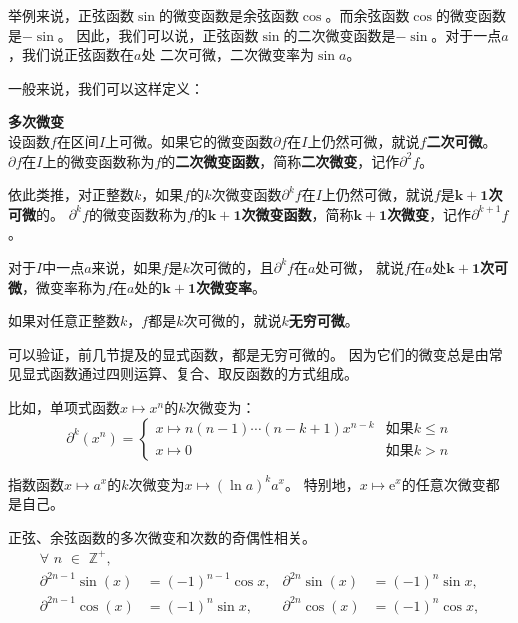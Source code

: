 \documentclass[12pt,UTF8,fontset=none]{ctexbook}
\begin{document}
举例来说，正弦函数$\sin$的微变函数是余弦函数$\cos$。而余弦函数$\cos$的微变函数是$-\sin$。
因此，我们可以说，正弦函数$\sin$的二次微变函数是$-\sin$。对于一点$a$，我们说正弦函数在$a$处
二次可微，二次微变率为$\sin{a}$。

一般来说，我们可以这样定义：
\begin{df}{\textbf{多次微变}}
    \mbox{} \\
    设函数$f$在区间$I$上可微。如果它的微变函数$\partial f$在$I$上仍然可微，就说$f$\textbf{二次可微}。
    $\partial f$在$I$上的微变函数称为$f$的\textbf{二次微变函数}，简称\textbf{二次微变}，记作$\partial^2 f$。
    
    依此类推，对正整数$k$，如果$f$的$k$次微变函数$\partial^k f$在$I$上仍然可微，就说$f$是$\boldsymbol{k+1}$\textbf{次可微}的。
    $\partial^k f$的微变函数称为$f$的$\boldsymbol{k+1}$\textbf{次微变函数}，简称$\boldsymbol{k+1}$\textbf{次微变}，记作$\partial^{k+1} f$。

    对于$I$中一点$a$来说，如果$f$是$k$次可微的，且$\partial^k f$在$a$处可微，
    就说$f$在$a$处$\boldsymbol{k+1}$\textbf{次可微}，微变率称为$f$在$a$处的$\boldsymbol{k+1}$\textbf{次微变率}。

    如果对任意正整数$k$，$f$都是$k$次可微的，就说$k$\textbf{无穷可微}。
\end{df}

可以验证，前几节提及的显式函数，都是无穷可微的。
因为它们的微变总是由常见显式函数通过四则运算、复合、取反函数的方式组成。

比如，单项式函数$x\mapsto x^n$的$k$次微变为：
$$ \partial^k (x^n) = \left\{
    \begin{array}{ll}
        x\mapsto n(n-1)\cdots(n-k+1) x^{n-k} & \mbox{如果} k \leqslant n \\
        x\mapsto 0 & \mbox{如果} k > n
    \end{array}\right.
$$

指数函数$x\mapsto a^x$的$k$次微变为$x\mapsto (\ln{a})^k a^x$。
特别地，$x\mapsto \mathrm{e}^x$的任意次微变都是自己。

正弦、余弦函数的多次微变和次数的奇偶性相关。
\begin{align*}
    \forall \,\,n\,\,\in\,\,\mathbb{Z}^+, \\
    \partial^{2n-1} \sin(x) &= (-1)^{n-1} \cos{x}, & \partial^{2n} \sin(x) &= (-1)^{n} \sin{x},  \\
    \partial^{2n-1} \cos(x) &= (-1)^{n} \sin{x}, & \partial^{2n} \cos(x) &= (-1)^{n} \cos{x},  
\end{align*}
\end{document}
